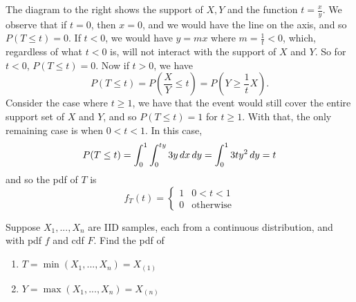 \documentclass[notoc,notitlepage]{tufte-book}
\begin{document}
\begin{solution}
  The diagram to the right shows the support of $X, Y$ and the function $t = \frac{x}{y}$.
  We observe that if $t = 0$, then $x = 0$, and we would have the line on the axis, and so $P(T \leq t) = 0$. If $t < 0$, we would have $y = mx$ where $m = \frac{1}{t} < 0$, which, regardless of what $t < 0$ is, will not interact with the support of $X$ and $Y$. So for $t < 0$, $P(T \leq t) = 0$. Now if $t > 0$, we have
  \begin{equation*}
    P(T \leq t) = P\left(\frac{X}{Y} \leq t\right) = P\left( Y \geq \frac{1}{t}X \right).
  \end{equation*}
  Consider the case where $t \geq 1$, we have that the event would still cover the entire support set of $X$ and $Y$, and so $P (T \leq t) = 1$ for $t \geq 1$. With that, the only remaining case is when $0 < t < 1$. In this case,
  \begin{equation*}
    P( T \leq t ) = \int_{0}^{1} \int_{0}^{ty} 3y \mathop{}\!d{x} \mathop{}\!d{y} = \int_{0}^{1} 3ty^2 \mathop{}\!d{y} = t
  \end{equation*}
  and so the pdf of $T$ is
  \begin{equation*}
    f_T(t) = \begin{cases}
      1 & 0 < t < 1 \\
      0 & \text{otherwise}
    \end{cases}
  \end{equation*}
\end{solution}

\begin{eg}\label{eg:4_3}
  Suppose $X_1, ..., X_n$ are IID samples, each from a continuous distribution, and with pdf $f$ and cdf $F$. Find the pdf of
  \begin{enumerate}
    \item $T = \min( X_1, ..., X_n ) = X_{(1)}$
    \item $Y = \max( X_1, ..., X_n ) = X_{(n)}$
  \end{enumerate}
\end{eg}
\end{document}
